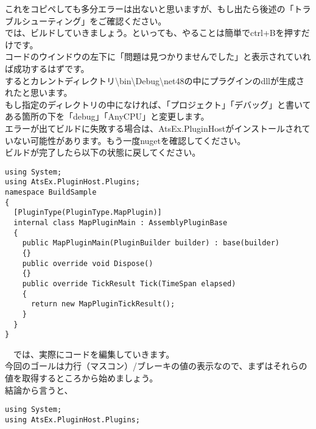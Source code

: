 \documentclass[b5paper,9pt,platex,dvipdfmx]{jsarticle}
\begin{document}
\begin{multicols*}{3}
これをコピペしても多分エラーは出ないと思いますが、もし出たら後述の「トラブルシューティング」をご確認ください。\\
では、ビルドしていきましょう。といっても、やることは簡単でctrl+Bを押すだけです。\\
コードのウインドウの左下に「問題は見つかりませんでした」と表示されていれば成功するはずです。\\
するとカレントディレクトリ\textbackslash bin\textbackslash Debug\textbackslash net48の中にプラグインのdllが生成されたと思います。\\
もし指定のディレクトリの中になければ、「プロジェクト」「デバッグ」と書いてある箇所の下を「debug」「AnyCPU」と変更します。\\
エラーが出てビルドに失敗する場合は、AtsEx.PluginHostがインストールされていない可能性があります。もう一度nugetを確認してください。\\
ビルドが完了したら以下の状態に戻してください。
\begin{lstlisting}[caption=MapPlugin.cs]
using System;
using AtsEx.PluginHost.Plugins;
namespace BuildSample
{
  [PluginType(PluginType.MapPlugin)]
  internal class MapPluginMain : AssemblyPluginBase
  {
    public MapPluginMain(PluginBuilder builder) : base(builder)
    {}
    public override void Dispose()
    {}
    public override TickResult Tick(TimeSpan elapsed)
    {
      return new MapPluginTickResult();
    }
  }
}
\end{lstlisting}
　では、実際にコードを編集していきます。\\
今回のゴールは力行（マスコン）/ブレーキの値の表示なので、まずはそれらの値を取得するところから始めましょう。\\
結論から言うと、
\begin{lstlisting}[caption= MapPlugin.cs]
using System;
using AtsEx.PluginHost.Plugins;


\end{lstlisting}
\end{multicols*}
\end{document}
